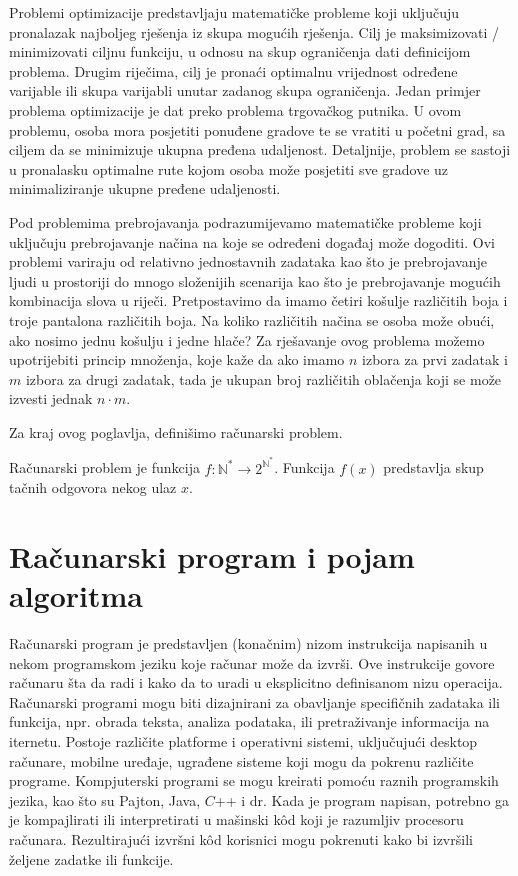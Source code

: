 Problemi optimizacije predstavljaju matematičke probleme koji uključu\-ju pronalazak najboljeg rješenja iz skupa mogućih rješenja. Cilj je maksimi\-zovati / minimizovati   ciljnu funkciju, u odnosu na skup  ograničenja dati definicijom problema. Drugim riječima, cilj je pronaći optimalnu vrijednost određene varijable ili skupa varijabli unutar zadanog skupa ograničenja. Jedan primjer problema optimizacije je dat preko problema trgovačkog putnika. U ovom problemu, osoba mora posjetiti ponuđene gradove te se vratiti u   početni grad, sa ciljem da se minimizuje ukupna pređena udaljenost. Detaljnije, problem se sastoji u pronalasku optimalne rute kojom osoba može posjetiti sve gradove uz minimaliziranje ukupne pređene udaljenosti.

Pod problemima prebrojavanja podrazumijevamo matematičke probleme koji uključuju prebrojavanje načina na koje se određeni događaj može dogoditi. Ovi problemi variraju od relativno jednostavnih zadataka kao što je prebrojavanje ljudi u prostoriji do mnogo složenijih scenarija kao što je prebrojavanje mogućih kombinacija slova u riječi. Pretpostavimo da imamo četiri košulje različitih boja i troje pantalona različitih boja. Na koliko različitih načina se osoba može obući, ako nosimo jednu košulju i jedne hlače?  Za rješavanje ovog problema možemo upotrijebiti princip množenja, koje kaže da ako imamo $ n$ izbora za prvi zadatak i $m$ izbora za drugi zadatak, tada je ukupan broj različitih oblačenja koji se može izvesti jednak  $n \cdot m$.

Za kraj ovog poglavlja, definišimo računarski problem.

\begin{definition}
	Računarski problem je funkcija $f \colon \mathbb{N}^* \rightarrow 2^{\mathbb{N}^*}$. Funkcija $f (x)$ predstavlja skup tačnih odgovora  nekog ulaz $x$.
\end{definition} 
 
\section{Računarski program i pojam algoritma}


Računarski program je predstavljen (konačnim) nizom instrukcija napisanih u nekom programskom jeziku koje računar  može da izvrši. Ove instrukcije govore računaru šta da radi i kako da to uradi u eksplicitno definisanom nizu operacija. Računarski programi mogu biti dizajnirani za obavljanje specifičnih zadataka ili funkcija,  npr. obrada teksta, analiza podataka,  ili pretraživanje informacija na iternetu. Postoje različite platforme  i operativni sistemi, uključujući desktop računare, mobilne uređaje, ugrađene sisteme koji mogu da pokrenu različite programe.  Kompjuterski programi se mogu kreirati pomoću raznih programskih jezika, kao što su Pajton, Java, $C$++  i dr. Kada je program napisan, potrebno ga je kompajlirati ili interpretirati u mašinski k\^od koji je razumljiv procesoru računara. Rezultirajući izvršni k\^od korisnici mogu pokrenuti kako bi izvršili željene zadatke ili funkcije.

